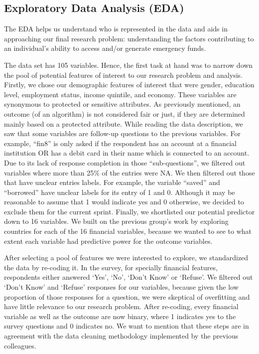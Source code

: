 \documentclass[12pt]{article}
\begin{document}
\hypertarget{exploratory-data-analysis-eda}{%
\subsection{Exploratory Data Analysis
(EDA)}\label{exploratory-data-analysis-eda}}

The EDA helps us understand who is represented in the data and aids in
approaching our final research problem: understanding the factors
contributing to an individual's ability to access and/or generate
emergency funds.

The data set has 105 variables. Hence, the first task at hand was to
narrow down the pool of potential features of interest to our research
problem and analysis. Firstly, we chose our demographic features of
interest that were gender, education level, employment status, income
quintile, and economy. These variables are synonymous to protected or
sensitive attributes. As previously mentioned, an outcome (of an
algorithm) is not considered fair or just, if they are determined mainly
based on a protected attribute. While reading the data description, we
saw that some variables are follow-up questions to the previous
variables. For example, ``fin8'' is only asked if the respondent has an
account at a financial institution OR has a debit card in their name
which is connected to an account. Due to its lack of response completion
in those ``sub-questions'', we filtered out variables where more than
25\% of the entries were NA. We then filtered out those that have
unclear entries labels. For example, the variable ``saved'' and
``borrowed'' have unclear labels for its entry of 1 and 0. Although it
may be reasonable to assume that 1 would indicate yes and 0 otherwise,
we decided to exclude them for the current sprint. Finally, we
shortlisted our potential predictor down to 16 variables. We built on
the previous group's work by exploring countries for each of the 16
financial variables, because we wanted to see to what extent each
variable had predictive power for the outcome variables.

After selecting a pool of features we were interested to explore, we
standardized the data by re-coding it. In the survey, for specially
financial features, respondents either answered `Yes', `No', `Don't
Know' or `Refuse'. We filtered out `Don't Know' and `Refuse' responses
for our variables, because given the low proportion of those responses
for a question, we were skeptical of overfitting and have little
relevance to our research problem. After re-coding, every financial
variable as well as the outcome are now binary, where 1 indicates yes to
the survey questions and 0 indicates no. We want to mention that these
steps are in agreement with the data cleaning methodology implemented by
the previous colleagues.
\end{document}
